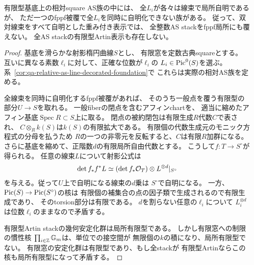 \begin{proposition}[全整数の線束標識に対するfppf被覆の障害]
\label{prop:qa-as-infinite-lines-no-common-atlas}
有限型基底上の相対square AS族の中には、
全$L_i$が各々は線束で局所自明であるが、
ただ一つのfppf被覆で全$L_i$を同時に自明化できない族がある。
従って、双対線束をすべて自明とした重み付き表示では、
全整数AS stackをfppf局所にも覆えない。
全AS stackの有限型Artin表示も存在しない。
\end{proposition}
\begin{proof}
基底を滑らかな射影楕円曲線$S$とし、
有限窓を定数古典squareとする。
互いに異なる素数$\ell_i$に対して、正確な位数が$\ell_i$の
$L_i\in\operatorname{Pic}^0(S)$を選ぶ。
系~\ref{cor:qa-relative-as-line-decorated-foundation}で
これらは実際の相対AS族を定める。

全線束を同時に自明化するfppf被覆があれば、
そのうち一般点を覆う有限型の部分$U\to S$を取れる。
一般fiberの閉点を含むアフィンchartを、
適当に縮めたアフィン基底$\operatorname{Spec}R\subset S$上に取る。
閉点の被約閉包は有限生成$R$代数$C$で表され、
$C\otimes_R k(S)$は$k(S)$の有限拡大である。
有限個の代数生成元のモニック方程式の分母を払うため
$R$の一つの非零元を反転すると、$C$は有限$R$加群になる。
さらに基底を縮めて、正階数$d$の有限局所自由代数とする。
こうして$f:T\to S^\circ$が得られる。
任意の線束$L$について射影公式は
\[
 \det f_*f^* L \simeq (\det f_*\mathcal O_T)\otimes L^{\otimes d}|_{S^\circ}
\]
を与える。従って$U$上で自明になる線束の$d$乗は
$S^\circ$で自明になる。
一方、$\operatorname{Pic}(S)\to\operatorname{Pic}(S^\circ)$の核は
有限個の補集合の点の因子類で生成されるので有限生成であり、
そのtorsion部分は有限である。
$d$を割らない任意の$\ell_i$について
$L_i^{\otimes d}$は位数$\ell_i$のままなので矛盾する。

有限型Artin stackの幾何安定化群は局所有限型である。
しかし有限窓への制限の慣性核
$\prod_{i\in\mathbb Z}\mathbb G_m$は、単位での接空間が
無限個の$k$の積になり、局所有限型でない。
有限窓の安定化群は有限型であり、もし全stackが
有限型Artinならこの核も局所有限型になって矛盾する。
\end{proof}

